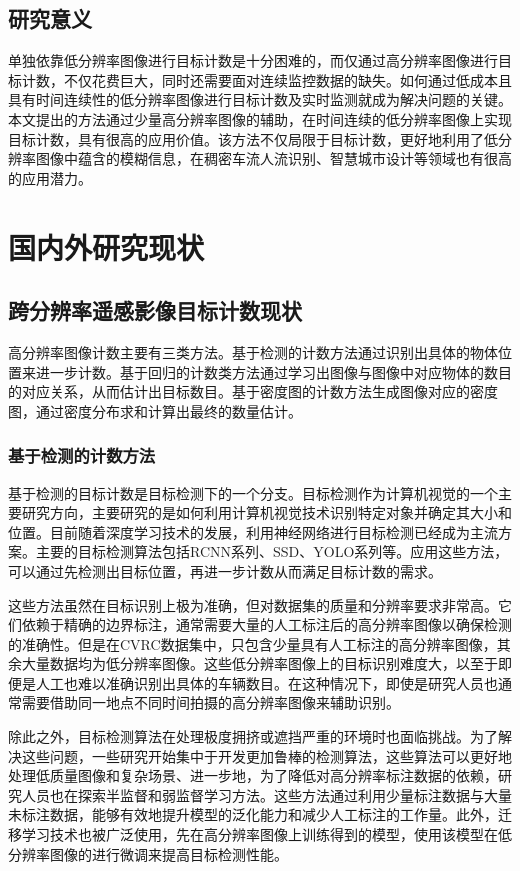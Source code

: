 \subsection{研究意义}
单独依靠低分辨率图像进行目标计数是十分困难的，而仅通过高分辨率图像进行目标计数，不仅花费巨大，同时还需要面对连续监控数据的缺失。如何通过低成本且具有时间连续性的低分辨率图像进行目标计数及实时监测就成为解决问题的关键。本文提出的方法通过少量高分辨率图像的辅助，在时间连续的低分辨率图像上实现目标计数，具有很高的应用价值。该方法不仅局限于目标计数，更好地利用了低分辨率图像中蕴含的模糊信息，在稠密车流人流识别、智慧城市设计等领域也有很高的应用潜力。

\section{国内外研究现状}
\subsection{跨分辨率遥感影像目标计数现状}
高分辨率图像计数主要有三类方法。基于检测的计数方法通过识别出具体的物体位置来进一步计数。基于回归的计数类方法通过学习出图像与图像中对应物体的数目的对应关系，从而估计出目标数目。基于密度图的计数方法生成图像对应的密度图，通过密度分布求和计算出最终的数量估计。

\subsubsection{基于检测的计数方法}
基于检测的目标计数是目标检测下的一个分支。目标检测作为计算机视觉的一个主要研究方向，主要研究的是如何利用计算机视觉技术识别特定对象并确定其大小和位置。目前随着深度学习技术的发展，利用神经网络进行目标检测已经成为主流方案。主要的目标检测算法包括RCNN系列\cite{girshick2014rich,girshick2015fast,ren2015faster}、SSD\cite{liu2016ssd}、YOLO系列\cite{redmon2016you,redmon2017yolo9000}等。应用这些方法，可以通过先检测出目标位置，再进一步计数从而满足目标计数的需求。

这些方法虽然在目标识别上极为准确，但对数据集的质量和分辨率要求非常高。它们依赖于精确的边界标注，通常需要大量的人工标注后的高分辨率图像以确保检测的准确性。但是在CVRC数据集中，只包含少量具有人工标注的高分辨率图像，其余大量数据均为低分辨率图像。这些低分辨率图像上的目标识别难度大，以至于即便是人工也难以准确识别出具体的车辆数目。在这种情况下，即使是研究人员也通常需要借助同一地点不同时间拍摄的高分辨率图像来辅助识别。

除此之外，目标检测算法在处理极度拥挤或遮挡严重的环境时也面临挑战。为了解决这些问题，一些研究开始集中于开发更加鲁棒的检测算法，这些算法可以更好地处理低质量图像和复杂场景、进一步地，为了降低对高分辨率标注数据的依赖，研究人员也在探索半监督和弱监督学习方法\cite{karimijafarbigloo2023self}。这些方法通过利用少量标注数据与大量未标注数据，能够有效地提升模型的泛化能力和减少人工标注的工作量。此外，迁移学习技术\cite{cheng2021transfer}也被广泛使用，先在高分辨率图像上训练得到的模型，使用该模型在低分辨率图像的进行微调来提高目标检测性能。


